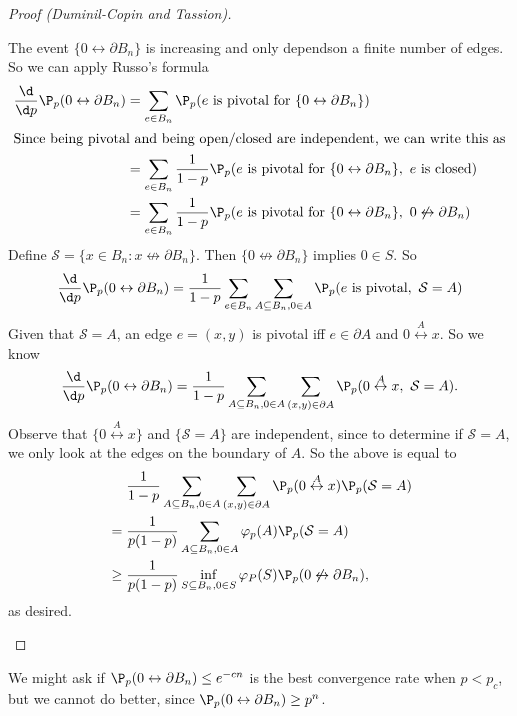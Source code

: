 \documentclass[a4paper]{article}
\begin{document}
\begin{proof}[Proof (Duminil-Copin and Tassion)]
\begin{enumerate}
      The event $\{0 \leftrightarrow \partial B_n\}$ is increasing and only dependson a finite number of edges. So we can apply Russo's formula
      \begin{align*}
        \frac{\d}{\d p} \P_p(0 \leftrightarrow \partial B_n) &= \sum_{e \in B_n} \P_p(e\text{ is pivotal for }\{0 \leftrightarrow \partial B_n\})\\
        \intertext{Since being pivotal and being open/closed are independent, we can write this as}
        &= \sum_{e \in B_n} \frac{1}{1 - p} \P_p(e\text{ is pivotal for }\{0 \leftrightarrow \partial B_n\},\ e\text{ is closed})\\
        &= \sum_{e \in B_n} \frac{1}{1 - p} \P_p(e\text{ is pivotal for }\{0 \leftrightarrow \partial B_n\},\ 0 \not\leftrightarrow \partial B_n)
      \end{align*}
      Define $\mathcal{S} = \{x \in B_n: x \not\leftrightarrow \partial B_n\}$. Then $\{0 \not\leftrightarrow \partial B_n\}$ implies $0 \in S$. So
      \[
        \frac{\d}{\d p} \P_p(0 \leftrightarrow \partial B_n) = \frac{1}{1 - p} \sum_{e \in B_n} \sum_{A \subseteq B_n, 0 \in A} \P_p(e\text{ is pivotal},\ \mathcal{S} = A)
      \]
      Given that $\mathcal{S} = A$, an edge $e = (x, y)$ is pivotal iff $e \in \partial A$ and $0 \overset{A}{\leftrightarrow} x$. So we know
      \[
        \frac{\d}{\d p} \P_p(0 \leftrightarrow \partial B_n) = \frac{1}{1 - p} \sum_{A \subseteq B_n, 0 \in A} \sum_{(x, y) \in \partial A} \P_p(0 \overset{A}{\leftrightarrow} x,\ \mathcal{S} = A).
      \]
      Observe that $\{0 \overset{A}{\leftrightarrow} x\}$ and $\{\mathcal{S} = A\}$ are independent, since to determine if $\mathcal{S} = A$, we only look at the edges on the boundary of $A$. So the above is equal to
      \begin{align*}
        &\hphantom{{}={}}\frac{1}{1 - p} \sum_{A \subseteq B_n, 0 \in A} \sum_{(x, y) \in \partial A} \P_p(0 \overset{A}{\leftrightarrow} x)\P_p(\mathcal{S} = A)\\
        &= \frac{1}{p(1 - p)} \sum_{A \subseteq B_n, 0 \in A} \varphi_p(A) \P_p(\mathcal{S} = A)\\
        &\geq \frac{1}{p(1 - p)} \inf_{S \subseteq B_n, 0 \in S} \varphi_P(S) \P_p(0 \not\leftrightarrow \partial B_n),
      \end{align*}
      as desired.\qedhere
  \end{enumerate}
\end{proof}
We might ask if $\P_p(0 \leftrightarrow \partial B_n) \leq e^{-cn}$ is the best convergence rate when $p < p_c$, but we cannot do better, since $\P_p(0 \leftrightarrow \partial B_n) \geq p^n$.
\end{document}
